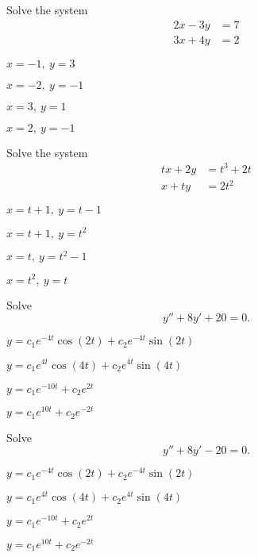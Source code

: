\begin{readinessAssuranceTest}
\setcounter{enumi}{20}

\item
Solve the system 
\begin{alignat*}{2}
2x-3y&= 7 \\
3x+4y&= 2
\end{alignat*}
\begin{multicols}{4}
\begin{readinessAssuranceTestChoices}
\item \(x=-1,\ y=3\)
\item \(x=-2,\ y=-1\)
\item \(x=3,\ y=1\)
\item \(x=2,\ y=-1\) %
\end{readinessAssuranceTestChoices}
\end{multicols}

\item
Solve the system
\begin{alignat*}{2}
tx+2y&=t^3+2t \\
x+ty&= 2t^2
\end{alignat*}
\begin{multicols}{4}
\begin{readinessAssuranceTestChoices}
\item \(x=t+1,\ y=t-1\)
\item \(x=t+1,\ y=t^2\)
\item \(x=t,\ y=t^2-1\)
\item \(x=t^2,\ y=t\) %
\end{readinessAssuranceTestChoices}
\end{multicols}

\item
Solve \[y''+8y'+20 = 0.\]
\begin{multicols}{2}
\begin{readinessAssuranceTestChoices}
\item \(y=c_1 e^{-4t}\cos(2t)+c_2e^{-4t}\sin(2t)\) %
\item \(y=c_1 e^{4t}\cos(4t)+c_2e^{4t}\sin(4t)\) 
\item \(y=c_1 e^{-10t}+c_2 e^{2t}\)
\item \(y=c_1 e^{10t}+c_2 e^{-2t}\)
\end{readinessAssuranceTestChoices}
\end{multicols}
\item
Solve \[y''+8y'-20 = 0.\]
\begin{multicols}{2}
\begin{readinessAssuranceTestChoices}
\item \(y=c_1 e^{-4t}\cos(2t)+c_2e^{-4t}\sin(2t)\) 
\item \(y=c_1 e^{4t}\cos(4t)+c_2e^{4t}\sin(4t)\) 
\item \(y=c_1 e^{-10t}+c_2 e^{2t}\)%
\item \(y=c_1 e^{10t}+c_2 e^{-2t}\)
\end{readinessAssuranceTestChoices}
\end{multicols}


\end{readinessAssuranceTest}
